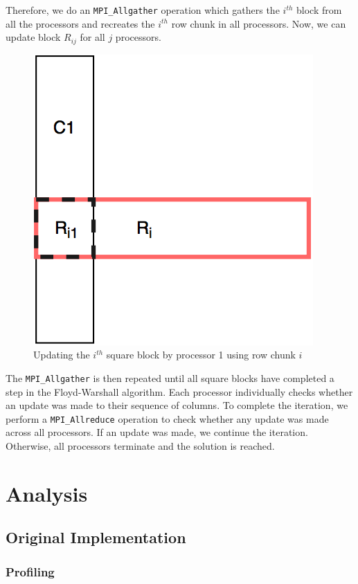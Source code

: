 \documentclass[11pt]{article}
\begin{document}
Therefore, we do an \texttt{MPI\_Allgather} operation which gathers the $i^{th}$ block from all the processors and recreates the $i^{th}$ row chunk in all processors. Now, we can update block $R_{ij}$ for all $j$ processors. 

\begin{figure}[H]
\centering
\includegraphics[scale=0.2]{row_col.png}
\caption{Updating the $i^{th}$ square block by processor 1 using row chunk $i$}
\label{fig:row_col}
\end{figure}

The \texttt{MPI\_Allgather} is then repeated until all square blocks have completed a step in the Floyd-Warshall algorithm. Each processor individually checks whether an update was made to their sequence of columns. To complete the iteration, we perform a \texttt{MPI\_Allreduce} operation to check whether any update was made across all processors. If an update was made, we continue the iteration. Otherwise, all processors terminate and the solution is reached.

\section{Analysis}

\subsection{Original Implementation}
\subsubsection{Profiling} \label{sec:prof}
\end{document}
